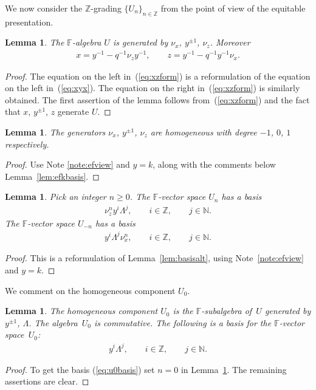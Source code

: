 \documentclass[11pt]{article}
\numberwithin{equation}{section}
\newtheorem{Lemma}[Theorem]{Lemma}
\begin{document}
 We now consider the $\mathbb Z$-grading
$\lbrace U_n\rbrace_{n\in \mathbb Z}$ from the point
of view of the equitable presentation.


\begin{Lemma}
\label{lem:gensetu}
The $\mathbb F$-algebra $U$ is generated by
$\nu_x$, $y^{\pm 1}$, $\nu_z$. Moreover
\begin{gather}
x = y^{-1}- q^{-1}\nu_z y^{-1},
\qquad
z = y^{-1}- q^{-1}y^{-1} \nu_x.
\label{eq:xzform}
\end{gather}
\end{Lemma}

\begin{proof}
The equation
on the left
in~(\ref{eq:xzform})
is a reformulation of
the equation on the left
in~(\ref{eq:xyx}).
The equation on the right in~(\ref{eq:xzform}) is similarly obtained.
The f\/irst assertion of the lemma follows
from~(\ref{eq:xzform}) and the fact that
$x$, $y^{\pm 1}$, $z$ generate
$U$.
\end{proof}


\begin{Lemma}
\label{lem:weightlist}
The generators
$\nu_x$, $y^{\pm 1}$, $\nu_z$ are homogeneous
with degree $-1$, $0$, $1$ respectively.
\end{Lemma}
\begin{proof}
Use Note
\ref{note:efview} and $y=k$, along with
 the comments below
Lemma~\ref{lem:efkbasis}.
\end{proof}

\begin{Lemma}
\label{lem:unbasis}
Pick an integer $n\geq 0$.
The $\mathbb F$-vector space $U_n$ has a basis
\begin{gather*}
\nu^n_z  y^i \Lambda^j,
  \qquad i\in \mathbb Z, \qquad j\in \mathbb N.
\end{gather*}
The $\mathbb F$-vector space $U_{-n}$ has a basis
\begin{gather*}
y^i \Lambda^j \nu^n_x,
 \qquad i\in \mathbb Z, \qquad j\in \mathbb N.
\end{gather*}
\end{Lemma}
\begin{proof}
This is a reformulation of
Lemma~\ref{lem:basisalt}, using
Note~\ref{note:efview} and $y=k$.
\end{proof}


 We comment on the homogeneous component
$U_0$.

\begin{Lemma}
\label{lem:u0facts}
The homogeneous component
$U_0$ is the $\mathbb F$-subalgebra
of~$U$ generated by
$y^{\pm 1}$,
$\Lambda $.
The algebra~$U_0$
is commutative.
The following is a basis for the
$\mathbb F$-vector space~$U_0$:
\begin{gather}
\label{eq:u0basis}
 y^i \Lambda^j,
  \qquad i\in \mathbb Z, \qquad    j\in \mathbb N.
\end{gather}
\end{Lemma}
\begin{proof}
To get the basis
(\ref{eq:u0basis}) set $n=0$ in
Lemma~\ref{lem:unbasis}. The remaining assertions
are clear.
\end{proof}
\end{document}
